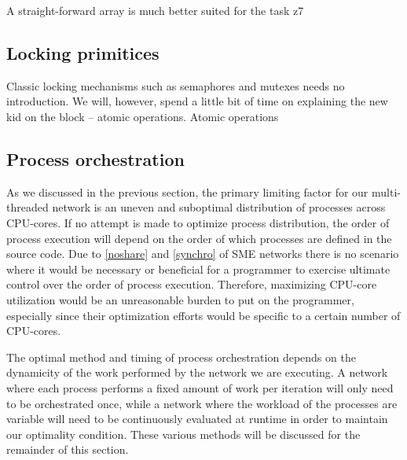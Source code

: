 A straight-forward array is much better suited for the task z7

\subsection{Locking primitices}
Classic locking mechanisms such as semaphores and mutexes needs no
introduction. We will, however, spend a little bit of time on
explaining the new kid on the block -- atomic operations.  Atomic
operations 

\subsection{Process orchestration}
As we discussed in the previous section, the primary limiting factor
for our multi-threaded network is an uneven and suboptimal
distribution of processes across CPU-cores. If no attempt is made to
optimize process distribution, the order of process execution will
depend on the order of which processes are defined in the source
code. Due to \cref{noshare} and \cref{synchro} of SME
networks there is no scenario where it would be necessary or
beneficial for a programmer to exercise ultimate control over the
order of process execution. Therefore, maximizing CPU-core utilization
would be an unreasonable burden to put on the programmer, especially
since their optimization efforts would be specific to a certain number
of CPU-cores.

The optimal method and timing of process orchestration depends on the
dynamicity  of the work
performed by the network we are executing. A network where each
process performs a fixed amount of work per iteration will only need
to be orchestrated once, while a network where the workload of the
processes are variable will need to be continuously evaluated at
runtime in order to maintain our optimality condition. These various
methods will be discussed for the remainder of this section.


